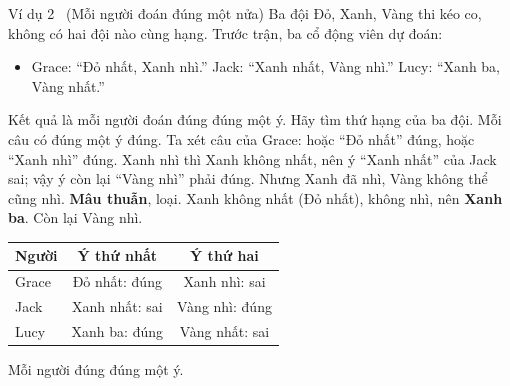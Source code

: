 \begin{exbox}{Ví dụ 2 \ (Mỗi người đoán đúng một nửa)}
Ba đội Đỏ, Xanh, Vàng thi kéo co, không có hai đội nào cùng hạng. Trước trận, ba cổ động viên dự đoán:
\begin{itemize}[leftmargin=1.4em,itemsep=0pt,topsep=2pt]
\item Grace: ``Đỏ nhất, Xanh nhì.'' \quad Jack: ``Xanh nhất, Vàng nhì.'' \quad Lucy: ``Xanh ba, Vàng nhất.''
\end{itemize}
Kết quả là mỗi người đoán đúng đúng một ý. Hãy tìm thứ hạng của ba đội.
\guide
{}
Mỗi câu có đúng một ý đúng. Ta xét câu của Grace: hoặc ``Đỏ nhất'' đúng, hoặc ``Xanh nhì'' đúng.
Xanh nhì thì Xanh không nhất, nên ý ``Xanh nhất'' của Jack sai; vậy ý còn lại ``Vàng nhì'' phải đúng. Nhưng Xanh đã nhì, Vàng
không thể cũng nhì. \textbf{Mâu thuẫn}, loại.
Xanh không nhất (Đỏ nhất), không nhì, nên \textbf{Xanh ba}. Còn lại Vàng nhì.
\begin{center}
\begin{tabular}{|l|c|c|}
\hline
\rowcolor{tmBlue!10} Người & Ý thứ nhất & Ý thứ hai \\ \hline
Grace & Đỏ nhất: \textcolor{tmGreen!70!black}{đúng} & Xanh nhì: \textcolor{AnsRed}{sai} \\ \hline
Jack & Xanh nhất: \textcolor{AnsRed}{sai} & Vàng nhì: \textcolor{tmGreen!70!black}{đúng} \\ \hline
Lucy & Xanh ba: \textcolor{tmGreen!70!black}{đúng} & Vàng nhất: \textcolor{AnsRed}{sai} \\ \hline
\end{tabular}
\end{center}
Mỗi người đúng đúng một ý.
\end{exbox}

